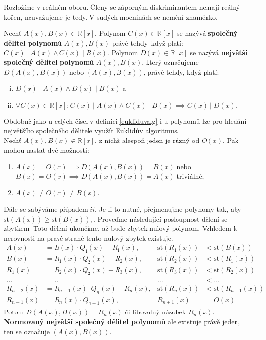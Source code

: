 \begin{reseni}
Rozložíme v reálném oboru. Členy se záporným diskriminantem nemají reálný kořen,
neuvažujeme je tedy. V sudých mocninách se nemění znaménko.
\end{reseni}

\begin{definition}
  Nechť $A(x), B(x) \in \mathbb R [x]$. Polynom $C(x) \in \mathbb R [x]$ se nazývá \textbf{společný dělitel polynomů} $A(x), B(x)$
  právě tehdy, když platí: $C(x) \mid A(x) \land C(x) \mid B(x)$.
  Polynom $D(x) \in \mathbb R [x]$ se nazývá \textbf{největší společný dělitel polynomů} $A(x), B(x)$, který označujeme $D(A(x), B(x))$ nebo $(A(x), B(x))$, právě tehdy, když platí:
  \begin{enumerate}[i.]
    \item $D(x) \mid A(x) \land D(x) \mid B(x)$ a
    \item $\forall C(x) \in \mathbb R [x]: C(x) \mid A(x) \land C(x) \mid B(x) \implies C(x) \mid D(x).$
  \end{enumerate}
\end{definition}

\begin{pozn}
  Obdobně jako u celých čísel v definici \ref{eukliduvalg} i u polynomů lze pro hledání největšího společného dělitele využít Euklidův algoritmus.\\
  Nechť $A(x), B(x) \in \mathbb R [x]$, z nichž alespoň jeden je různý od $O(x)$. Pak mohou nastat dvě možnosti:
  \begin{enumerate}[$i.$]
    \item $A(x) = O(x) \implies D(A(x), B(x)) = B(x)$ nebo $B(x) = O(x) \implies D(A(x), B(x)) = A(x)$ triviálně;
    \item $A(x)\ne O(x)\ne B(x)$.
  \end{enumerate}
  Dále se zabýváme případem $ii$. Je-li to nutné, přejmenujme polynomy tak, aby $\text{st}(A(x)) \geq \text{st}(B(x)),$.
  Proveďme následující posloupnost dělení se zbytkem. Toto dělení ukončíme, až bude zbytek nulový polynom.
  Vzhledem k nerovnosti na pravé straně tento nulový zbytek existuje.
  \begin{align*}
    A(x) & = B(x) \cdot Q_1(x) + R_1(x),  & \text{st}(R_1(x)) & < \text{st}(B(x)) \\
    B(x) & = R_1(x) \cdot Q_2(x) + R_2(x), & \text{st}(R_2(x)) & < \text{st}(R_1(x)) \\
    R_1(x) & = R_2(x) \cdot Q_3(x) + R_3(x), & \text{st}(R_3(x)) & < \text{st}(R_2(x))\\
    \dots & = \dots & \dots & < \dots\\
    R_{n-2}(x) & = R_{n-1}(x) \cdot Q_n(x) + R_n(x), & \text{st}(R_n(x)) & < \text{st}(R_{n-1}(x)) \\
    R_{n-1}(x) & = R_{n}(x) \cdot Q_{n+1}(x), & R_{n+1}(x) & = O(x).
  \end{align*}
  Potom $D(A(x), B(x)) = R_n(x)$ či libovolný násobek $R_n(x)$. \textbf{Normovaný největší společný dělitel polynomů}
  ale existuje právě jeden, ten se označuje $(A(x), B(x))$.
\end{pozn}


